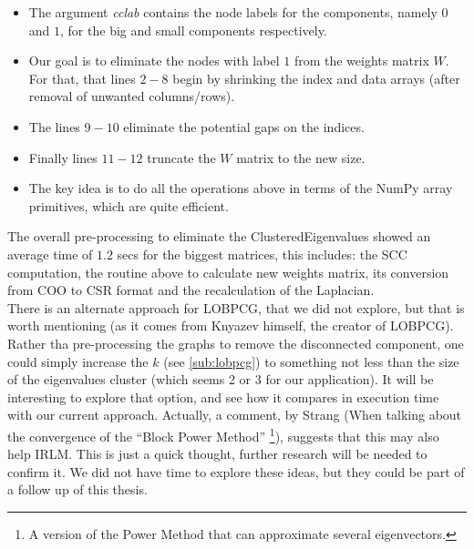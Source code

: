 \begin{itemize}
  \item The argument \emph{cclab} contains the node labels for the
    components, namely $0$ and $1$, for the big and small components
    respectively. \\
  \item  Our goal is to eliminate the nodes with label $1$ from the
    weights matrix $W$. For that, that lines $2-8$ begin by shrinking
    the index and data arrays (after removal of unwanted
    columns/rows). \\
  \item The lines $9-10$ eliminate the potential gaps on the
    indices. \\
  \item Finally lines $11-12$ truncate the $W$ matrix to the new
    size. \\
  \item The key idea is to do all the operations above in terms of the
    NumPy \cite{numpy} array primitives, which are quite efficient. \\
\end{itemize}

The overall pre-processing to eliminate the \gls{ClusteredEigenvalues} 
showed an average time of $1.2$ secs for the biggest
matrices, this includes: the \gls{SCC} computation, the routine above
to calculate new weights matrix, its conversion from COO
to CSR format and the recalculation of the \gls{Laplacian}. \\

There is an alternate approach for \gls{LOBPCG}, that we did not
explore, but that is worth mentioning (as it comes from Knyazev 
himself, the creator of \gls{LOBPCG}). Rather tha pre-processing the
graphs to remove the disconnected component, one could simply
increase the $k$ (see \cref{sub:lobpcg}) to something not less than
the size of the eigenvalues cluster (which  
seems 2 or 3 for our application). It will be interesting to 
explore that option, and see how it compares in execution time
with our current approach. Actually, a comment, by Strang 
\cite{strang88} (When talking about the convergence of the ``Block
Power Method'' \footnote{A version of the Power Method that can
  approximate several eigenvectors.}), suggests that this may
also help \gls{IRLM}. This is 
just a quick thought, further research will be needed to confirm
it. We did not have time to explore these ideas, but they could be part of
a follow up of this thesis.

